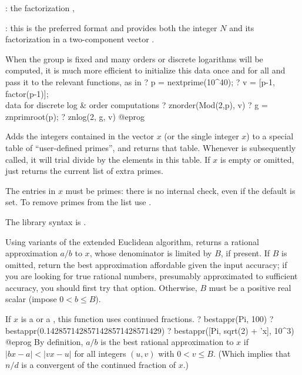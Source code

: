 \item {}: the factorization ,

\item {}: this is the preferred format and provides both the
integer $N$ and its factorization in a two-component vector
\kbd{[$N$, fa]}.

When the group is fixed and many orders or discrete logarithms will be
computed, it is much more efficient to initialize this data once and for all
and pass it to the relevant functions, as in
\bprog
? p = nextprime(10^40);
? v = [p-1, factor(p-1)]; \\ data for discrete log & order computations
? znorder(Mod(2,p), v)
? g = znprimroot(p);
? znlog(2, g, v)
@eprog
\bigskip


\label{se:addprimes}
Adds the integers contained in the
vector $x$ (or the single integer $x$) to a special table of
``user-defined primes'', and returns that table. Whenever  is
subsequently called, it will trial divide by the elements in this table.
If $x$ is empty or omitted, just returns the current list of extra
primes.

The entries in $x$ must be primes: there is no internal check, even if
the  default is set. To remove primes from the list use
.

The library syntax is .

\label{se:bestappr}
Using variants of the extended Euclidean algorithm, returns a rational
approximation $a/b$ to $x$, whose denominator is limited
by $B$, if present. If $B$ is omitted, return the best approximation
affordable given the input accuracy; if you are looking for true rational
numbers, presumably approximated to sufficient accuracy, you should first
try that option. Otherwise, $B$ must be a positive real scalar (impose
$0 < b \leq B$).

\item If $x$ is a  or a , this function uses continued
fractions.
\bprog
? bestappr(Pi, 100)
? bestappr(0.1428571428571428571428571429)
? bestappr([Pi, sqrt(2) + 'x], 10^3)
@eprog
By definition, $a/b$ is the best rational approximation to $x$ if
$|b x - a| < |v x - u|$ for all integers $(u,v)$ with $0 < v \leq B$.
(Which implies that $n/d$ is a convergent of the continued fraction of $x$.)

